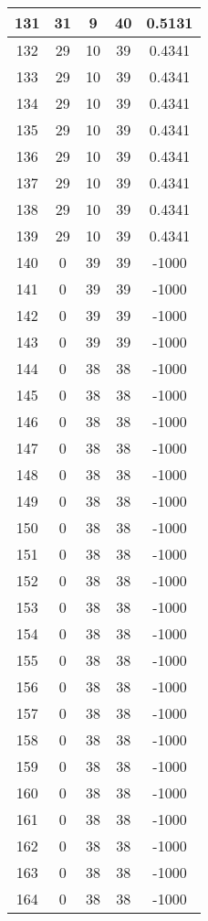 \documentclass[letterpaper, 12pt]{article}
\begin{document}
\begin{longtable}{|c|c|c|c|c|}
\hline
131 & 31 & 9 & 40 & 0.5131 \\
\hline
132 & 29 & 10 & 39 & 0.4341 \\
\hline
133 & 29 & 10 & 39 & 0.4341 \\
\hline
134 & 29 & 10 & 39 & 0.4341 \\
\hline
135 & 29 & 10 & 39 & 0.4341 \\
\hline
136 & 29 & 10 & 39 & 0.4341 \\
\hline
137 & 29 & 10 & 39 & 0.4341 \\
\hline
138 & 29 & 10 & 39 & 0.4341 \\
\hline
139 & 29 & 10 & 39 & 0.4341 \\
\hline
140 & 0 & 39 & 39 & -1000 \\
\hline
141 & 0 & 39 & 39 & -1000 \\
\hline
142 & 0 & 39 & 39 & -1000 \\
\hline
143 & 0 & 39 & 39 & -1000 \\
\hline
144 & 0 & 38 & 38 & -1000 \\
\hline
145 & 0 & 38 & 38 & -1000 \\
\hline
146 & 0 & 38 & 38 & -1000 \\
\hline
147 & 0 & 38 & 38 & -1000 \\
\hline
148 & 0 & 38 & 38 & -1000 \\
\hline
149 & 0 & 38 & 38 & -1000 \\
\hline
150 & 0 & 38 & 38 & -1000 \\
\hline
151 & 0 & 38 & 38 & -1000 \\
\hline
152 & 0 & 38 & 38 & -1000 \\
\hline
153 & 0 & 38 & 38 & -1000 \\
\hline
154 & 0 & 38 & 38 & -1000 \\
\hline
155 & 0 & 38 & 38 & -1000 \\
\hline
156 & 0 & 38 & 38 & -1000 \\
\hline
157 & 0 & 38 & 38 & -1000 \\
\hline
158 & 0 & 38 & 38 & -1000 \\
\hline
159 & 0 & 38 & 38 & -1000 \\
\hline
160 & 0 & 38 & 38 & -1000 \\
\hline
161 & 0 & 38 & 38 & -1000 \\
\hline
162 & 0 & 38 & 38 & -1000 \\
\hline
163 & 0 & 38 & 38 & -1000 \\
\hline
164 & 0 & 38 & 38 & -1000 \\

\end{longtable}
\end{document}
